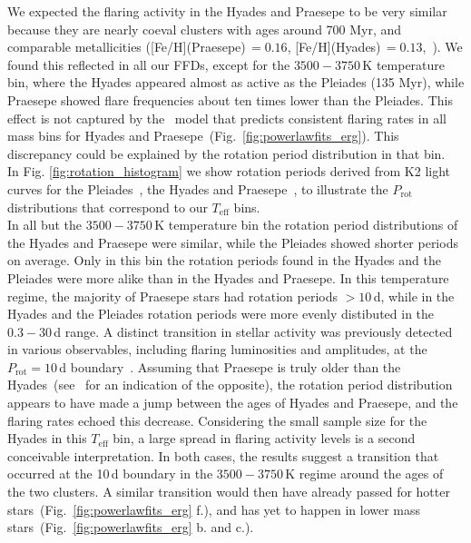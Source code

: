 \documentclass{aa}
\begin{document}
We expected the flaring activity in the Hyades and Praesepe to be very similar because they are nearly coeval clusters with ages around 700 Myr, and comparable metallicities ([Fe/H](Praesepe)\,$=0.16$, [Fe/H](Hyades)\,$=0.13$,~\citealt{netopil_metallicities_2016}). We found this reflected in all our FFDs, except for the $3500-3750$\,K temperature bin, where the Hyades appeared almost as active as the Pleiades (135 Myr), while Praesepe showed flare frequencies about ten times lower than the Pleiades. This effect is not captured by the~\citet{davenport2019} model that predicts consistent flaring rates in all mass bins for Hyades and Praesepe~(Fig.~\ref{fig:powerlawfits_erg}). This discrepancy could be explained by the rotation period distribution in that bin. 
\\
In Fig. \ref{fig:rotation_histogram} we show rotation periods derived from K2 light curves for the Pleiades~\citep{rebull_pleiadesrot_2016}, the Hyades and Praesepe~\citep{douglas2019}, to illustrate the $P_\mathrm{rot}$ distributions that correspond to our $T_\mathrm{eff}$ bins.
\\
In all but the $3500-3750$\,K temperature bin the rotation period distributions of the Hyades and Praesepe were similar, while the Pleiades showed shorter periods on average. Only in this bin the rotation periods found in the Hyades and the Pleiades were more alike than in the Hyades and Praesepe. In this temperature regime, the majority of Praesepe stars had rotation periods $>10$\,d, while in the Hyades and the Pleiades rotation periods were more evenly distibuted in the $0.3-30$\,d range. A distinct transition in stellar activity was previously detected in various observables, including flaring luminosities and amplitudes, at the $P_\mathrm{rot}=10$\,d boundary~\citep{stelzer2016, lu2019}. Assuming that Praesepe is truly older than the Hyades~(see~\citet{douglas2019} for an indication of the opposite), the rotation period distribution appears to have made a jump between the ages of Hyades and Praesepe, and the flaring rates echoed this decrease. Considering the small sample size for the Hyades in this $T_\mathrm{eff}$ bin, a large spread in flaring activity levels is a second conceivable interpretation. In both cases, the results suggest a transition that occurred at the 10\,d boundary in the $3500-3750$\,K regime around the ages of the two clusters. A similar transition would then have already passed for hotter stars~(Fig.~\ref{fig:powerlawfits_erg} f.), and has yet to happen in lower mass stars~(Fig.~\ref{fig:powerlawfits_erg} b. and c.).
\end{document}
